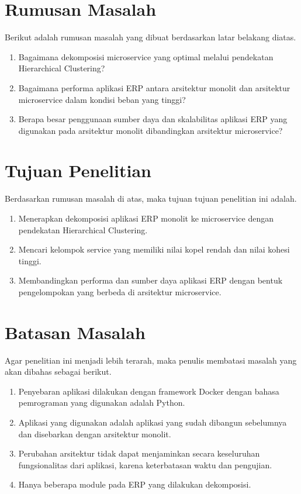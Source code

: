 \section{Rumusan Masalah}
Berikut adalah rumusan masalah yang dibuat berdasarkan latar belakang diatas.
\begin{enumerate}[nolistsep,leftmargin=0.5cm]
  \item Bagaimana dekomposisi microservice yang optimal melalui pendekatan Hierarchical Clustering?
  \item Bagaimana performa aplikasi ERP antara arsitektur monolit dan arsitektur microservice dalam kondisi beban yang tinggi?
  \item Berapa besar penggunaan sumber daya dan skalabilitas aplikasi ERP yang digunakan pada arsitektur monolit dibandingkan arsitektur microservice?\\
\end{enumerate}

\section{Tujuan Penelitian}
Berdasarkan rumusan masalah di atas, maka tujuan tujuan penelitian ini adalah.
\begin{enumerate}[nolistsep,leftmargin=0.5cm]
  \item Menerapkan dekomposisi aplikasi ERP monolit ke microservice dengan pendekatan Hierarchical Clustering.
  \item Mencari kelompok service yang memiliki nilai kopel rendah dan nilai kohesi tinggi.
  \item Membandingkan performa dan sumber daya aplikasi ERP dengan bentuk pengelompokan yang berbeda di arsitektur microservice. \\
\end{enumerate}

\section{Batasan Masalah}
Agar penelitian ini menjadi lebih terarah, maka penulis membatasi masalah yang akan dibahas sebagai berikut.
\begin{enumerate}[nolistsep,leftmargin=0.5cm]
  \item Penyebaran aplikasi dilakukan dengan framework Docker dengan bahasa pemrograman yang digunakan adalah Python.
  \item Aplikasi yang digunakan adalah aplikasi yang sudah dibangun sebelumnya dan disebarkan dengan arsitektur monolit.
  \item Perubahan arsitektur tidak dapat menjaminkan secara keseluruhan fungsionalitas dari aplikasi, karena keterbatasan waktu dan pengujian.
  \item Hanya beberapa module pada ERP yang dilakukan dekomposisi.\\
\end{enumerate}

